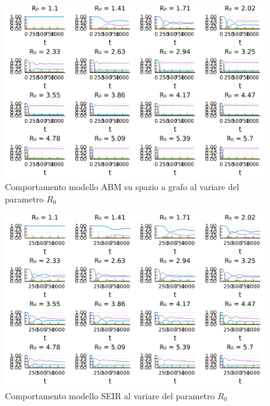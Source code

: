 \begin{figure}[H]
    \begin{center}
		\includegraphics[width=\textwidth]{img/COMPARISON DIFFERENT R0 VALUE_2023-06-29.jpg}
		\caption{Comportamento modello ABM su spazio a grafo al variare del parametro $R_0$}
		\label{fig:strange_behaviour_R0_abm}
	\end{center}
\end{figure}

\begin{figure}[H]
    \begin{center}
		\includegraphics[width=\textwidth]{img/COMPARISON DIFFERENT R0 VALUE_2023-06-29 (1).jpg}
		\caption{Comportamento modello SEIR al variare del parametro $R_0$}
		\label{fig:strange_behaviour_R0_ode}
	\end{center}
\end{figure}

